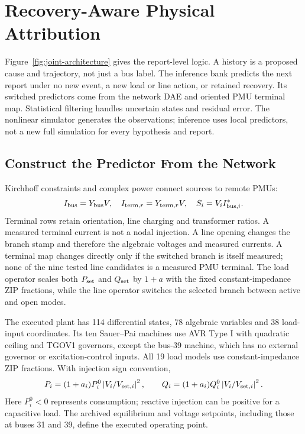 \section{Recovery-Aware Physical Attribution}
\label{sec:narrative-method}

Figure~\ref{fig:joint-architecture} gives the report-level logic. A
history is a proposed cause and trajectory, not just a bus label. The
inference bank predicts the next report under no new event, a new load or
line action, or retained recovery. Its switched predictors come from the
network DAE and oriented PMU terminal map. Statistical filtering handles
uncertain states and residual error. The nonlinear simulator generates the
observations; inference uses local predictors, not a new full simulation
for every hypothesis and report.

\subsection{Construct the Predictor From the Network}

Kirchhoff constraints and complex power connect sources to remote PMUs:
\begin{equation}
 I_{\rm bus}=Y_{\rm bus}V,\quad
 I_{{\rm term},r}=Y_{{\rm term},r}V,\quad S_i=V_i I_{{\rm bus},i}^{*}.
 \label{eq:narrative-electrical}
\end{equation}
Terminal rows retain orientation, line charging and transformer ratios.
A measured terminal current is not a nodal injection. A line opening
changes the branch stamp and therefore the algebraic voltages and measured
currents. A terminal map changes directly only if the switched branch is
itself measured; none of the nine tested line candidates is a measured PMU
terminal. The load operator scales both $P_{\rm set}$ and $Q_{\rm set}$
by $1+a$ with the fixed constant-impedance ZIP fractions, while the line
operator switches the selected branch between active and open modes.

The executed plant has 114 differential states, 78 algebraic variables
and 38 load-input coordinates. Its ten Sauer--Pai machines use AVR Type I
with quadratic ceiling and TGOV1 governors, except the bus-39 machine,
which has no external governor or excitation-control inputs. All 19 load
models use constant-impedance ZIP fractions. With injection sign convention,
\begin{equation}
 P_i=(1+a_i)P_i^0\left|V_i/V_{{\rm set},i}\right|^2,\qquad
 Q_i=(1+a_i)Q_i^0\left|V_i/V_{{\rm set},i}\right|^2.
 \label{eq:implemented-load-law}
\end{equation}
Here $P_i^0<0$ represents consumption; reactive injection can be positive
for a capacitive load. The archived equilibrium and voltage setpoints,
including those at buses 31 and 39, define the executed operating point.

